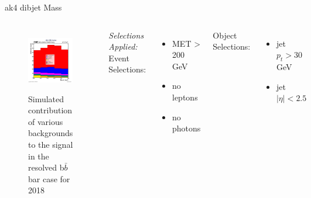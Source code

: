 \documentclass[10pt,xcolor=dvipsnames]{beamer}
\begin{document}
     \begin{frame}[fragile]{ak4 dibjet Mass}
      \begin{columns}
        \begin{figure}
          \centering
          \includegraphics[width=1\textwidth]{../Backgrounds/plots/SR_Resolved_Backgrounds_dijet_mass_Combined.png}
          \label{contribution}
          \caption{Simulated contribution of various backgrounds to the signal in the resolved b$ \bar{b} $ bar case for 2018}
        \end{figure}
        \textit{Selections Applied:} \\
        Event Selections:
        \begin{itemize}
          \raggedright 
          \tiny
          \item {MET > 200 GeV}
          \item {no leptons}
          \item {no photons}
        \end{itemize}
        Object Selections:
        \begin{itemize}
          \raggedright 
          \tiny
          \item {jet $p_t > 30 $ GeV}
          \item {jet $| \eta | < 2.5 $}

\end{itemize}
\end{columns}
\end{frame}
\end{document}
